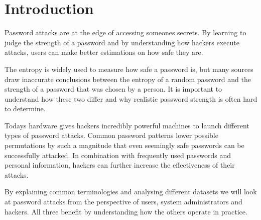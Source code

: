 \section{Introduction}

Password attacks are at the edge of accessing someones secrets. By learning to judge the strength of a password and by understanding how hackers execute attacks, users can make better estimations on how safe they are.

The entropy is widely used to measure how safe a password is, but many sources draw inaccurate conclusions between the entropy of a random password and the strength of a password that was chosen by a person. It is important to understand how these two differ and why realistic password strength is often hard to determine.

Todays hardware gives hackers incredibly powerful machines to launch different types of password attacks. Common password patterns lower possible permutations by such a magnitude that even seemingly safe passwords can be successfully attacked. In combination with frequently used passwords and personal information, hackers can further increase the effectiveness of their attacks.

By explaining common terminologies and analysing different datasets we will look at password attacks from the perspective of users, system administrators and hackers. All three benefit by understanding how the others operate in practice.

\newpage